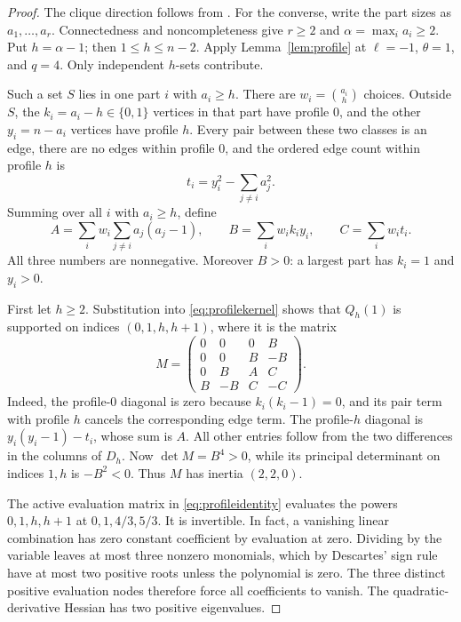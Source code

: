 \documentclass[11pt]{article}
\theoremstyle{remark}
\begin{document}
\begin{proof}
The clique direction follows from \cite[Theorem 3.1]{LOS}.
For the converse, write the part sizes as $a_1,\ldots,a_r$.
Connectedness and noncompleteness give $r\geq2$ and
$\alpha=\max_i a_i\geq2$. Put $h=\alpha-1$; then
$1\leq h\leq n-2$. Apply Lemma~\ref{lem:profile} at
$\ell=-1$, $\theta=1$, and $q=4$. Only independent $h$-sets contribute.

Such a set $S$ lies in one part $i$ with $a_i\geq h$.
There are $w_i=\binom{a_i}{h}$ choices. Outside $S$, the
$k_i=a_i-h\in\{0,1\}$ vertices in that part have profile $0$,
and the other $y_i=n-a_i$ vertices have profile $h$.
Every pair between these two classes is an edge, there are no edges
within profile $0$, and the ordered edge count within profile $h$ is
\[
 t_i=y_i^2-\sum_{j\ne i}a_j^2.
\]
Summing over all $i$ with $a_i\geq h$, define
\begin{equation}
 A=\sum_i w_i\sum_{j\ne i}a_j(a_j-1),\qquad
 B=\sum_i w_i k_i y_i,\qquad C=\sum_i w_i t_i.
 \label{eq:multipartiteABC}
\end{equation}
All three numbers are nonnegative. Moreover $B>0$: a largest
part has $k_i=1$ and $y_i>0$.

First let $h\geq2$. Substitution into \eqref{eq:profilekernel}
shows that $Q_h(1)$ is supported on indices $(0,1,h,h+1)$,
where it is the matrix
\begin{equation}
 M=\begin{pmatrix}
 0&0&0&B\\0&0&B&-B\\0&B&A&C\\B&-B&C&-C
 \end{pmatrix}.                                    \label{eq:multipartiteM}
\end{equation}
Indeed, the profile-$0$ diagonal is zero because $k_i(k_i-1)=0$,
and its pair term with profile $h$ cancels the corresponding edge
term. The profile-$h$ diagonal is $y_i(y_i-1)-t_i$, whose sum is $A$.
All other entries follow from the two differences in the columns of $D_h$.
Now $\det M=B^4>0$, while its principal determinant on indices
$1,h$ is $-B^2<0$. Thus $M$ has inertia $(2,2,0)$.

The active evaluation matrix in \eqref{eq:profileidentity} evaluates
the powers $0,1,h,h+1$ at $0,1,4/3,5/3$. It is invertible.
In fact, a vanishing linear combination has zero constant coefficient
by evaluation at zero. Dividing by the variable leaves at most three
nonzero monomials, which by Descartes' sign rule have at most two
positive roots unless the polynomial is zero. The three distinct
positive evaluation nodes therefore force all coefficients to vanish.
The quadratic-derivative Hessian has two positive eigenvalues.


\end{proof}
\end{document}
